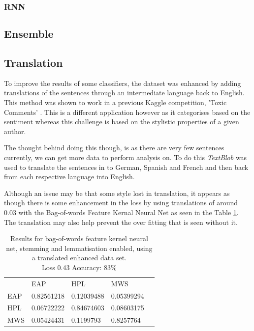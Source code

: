   \subsubsection{RNN}
  \label{sec:rnn_grid_search}

  \subsection{Ensemble}
  \label{sec:ensemble}
  
  \subsection{Translation}
  \label{sec:translation}
 To improve the results of some classifiers, the dataset was enhanced by adding translations of the sentences through an intermediate language back to English. This method was shown to work in a previous Kaggle competition, 'Toxic Comments' \cite{Jigsaw2017}. This is a different application however as it categorises based on the sentiment whereas this challenge is based on the stylistic properties of a given author.
  
  The thought behind doing this though, is as there are very few sentences currently, we can get more data to perform analysis on. To do this \textit{TextBlob} was used to translate the sentences in to German, Spanish and French and then back from each respective language into English. 
  
  Although an issue may be that some style lost in translation, it appears as though there is some enhancement in the loss by using translations of around 0.03 with the Bag-of-words Feature Kernal Neural Net as seen in the Table \ref{tab:bow_nn_res_tran}. The translation may also help prevent the over fitting that is seen without it.
  
\begin{table}[h]
\centering
\begin{tabular}{m{1cm}|m{1cm}|m{1cm}|m{1cm}|m{0cm}}
\multicolumn{1}{m{1cm}}{} & \multicolumn{1}{m{1cm}}{EAP} & \multicolumn{1}{m{1cm}}{HPL} & \multicolumn{1}{m{1cm}}{MWS} &\\[5pt]
\cline{2-4}
EAP & 0.82561218 & 0.12039488 & 0.05399294 & \\[5pt]
\cline{2-4}
HPL & 0.06722222 & 0.84674603 & 0.08603175 & \\[5pt]
\cline{2-4}
MWS & 0.05424431 & 0.1199793 & 0.8257764 & \\[5pt]
\cline{2-4}
\end{tabular}
\caption{Results for bag-of-words feature kernel neural net, stemming and lemmatisation enabled, using a translated enhanced data set.\\Loss 0.43 Accuracy: 83\% }
\label{tab:bow_nn_res_tran}
\end{table}

